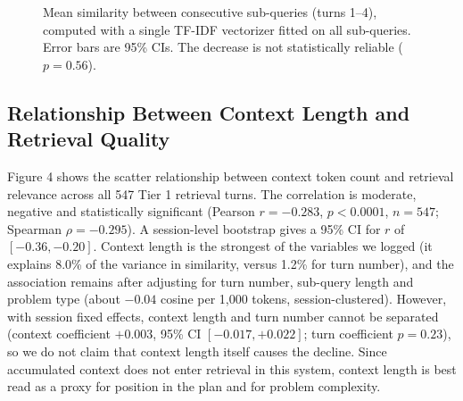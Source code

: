 \documentclass[11pt,a4paper]{article}
\begin{document}
\begin{figure}[H]
\caption{Mean similarity between consecutive sub-queries (turns 1--4), computed with a single TF-IDF vectorizer fitted on all sub-queries. Error bars are 95\% CIs. The decrease is not statistically reliable ($p = 0.56$).}
\end{figure}

\subsection{Relationship Between Context Length and Retrieval Quality}
Figure 4 shows the scatter relationship between context token count and retrieval relevance across all 547
Tier 1 retrieval turns. The correlation is moderate, negative and statistically significant (Pearson
$r = -0.283$, $p < 0.0001$, $n = 547$; Spearman $\rho = -0.295$). A session-level bootstrap gives a 95\% CI for $r$
of $[-0.36, -0.20]$. Context length is the strongest of the variables we logged (it explains 8.0\% of the variance
in similarity, versus 1.2\% for turn number), and the association remains after adjusting for turn number,
sub-query length and problem type (about $-0.04$ cosine per 1,000 tokens, session-clustered). However, with
session fixed effects, context length and turn number cannot be separated (context coefficient $+0.003$, 95\% CI
$[-0.017, +0.022]$; turn coefficient $p = 0.23$), so we do not claim that context length itself causes the decline.
Since accumulated context does not enter retrieval in this system, context length is best read as a proxy for
position in the plan and for problem complexity.
\end{document}
